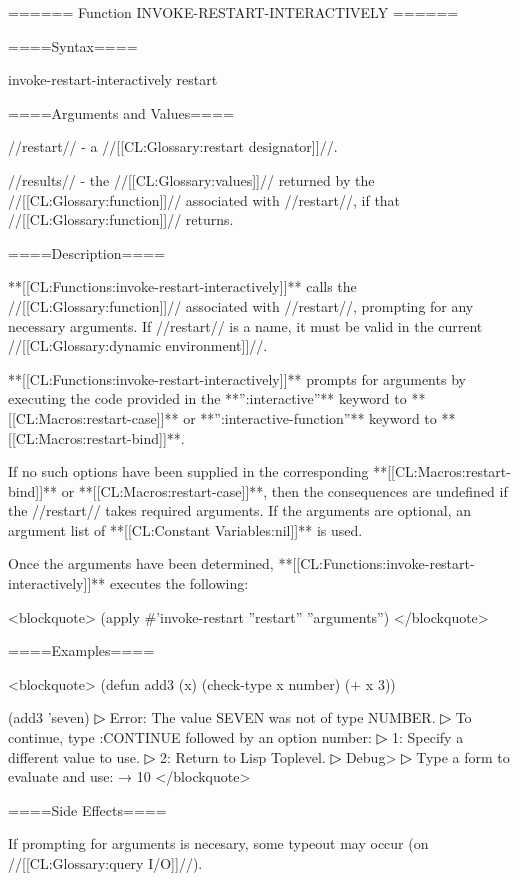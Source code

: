 ====== Function INVOKE-RESTART-INTERACTIVELY ======

====Syntax====

\DefunWithValues invoke-restart-interactively {restart} {}

====Arguments and Values====

//restart// - a //[[CL:Glossary:restart designator]]//.

//results// - the //[[CL:Glossary:values]]// returned by the //[[CL:Glossary:function]]// associated with //restart//, if that //[[CL:Glossary:function]]// returns.

====Description====

**[[CL:Functions:invoke-restart-interactively]]** calls the //[[CL:Glossary:function]]// associated with //restart//, prompting for any necessary arguments. If //restart// is a name, it must be valid in the current //[[CL:Glossary:dynamic environment]]//.

**[[CL:Functions:invoke-restart-interactively]]** prompts for arguments by executing the code provided in the **'':interactive''** keyword to **[[CL:Macros:restart-case]]** or **'':interactive-function''** keyword to **[[CL:Macros:restart-bind]]**.

If no such options have been supplied in the corresponding **[[CL:Macros:restart-bind]]** or **[[CL:Macros:restart-case]]**, then the consequences are undefined if the //restart// takes required arguments. If the arguments are optional, an argument list of **[[CL:Constant Variables:nil]]** is used.

Once the arguments have been determined, **[[CL:Functions:invoke-restart-interactively]]** executes the following:

<blockquote> (apply #'invoke-restart ''restart'' ''arguments'') </blockquote>


====Examples====

<blockquote> (defun add3 (x) (check-type x number) (+ x 3))

(add3 'seven)
▷ Error: The value SEVEN was not of type NUMBER.
▷ To continue, type :CONTINUE followed by an option number:
▷ 1: Specify a different value to use.
▷ 2: Return to Lisp Toplevel.
▷ Debug> 
▷ Type a form to evaluate and use:  → 10 </blockquote>

====Side Effects====

If prompting for arguments is necesary, some typeout may occur (on //[[CL:Glossary:query I/O]]//).


